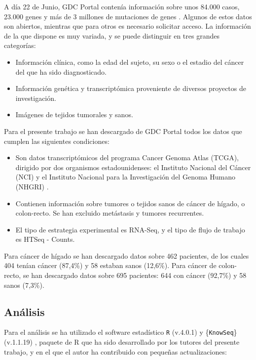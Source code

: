 A día 22 de Junio, GDC Portal contenía información sobre unos 84.000 casos, 23.000 genes y más de 3 millones de mutaciones de genes \cite{GDCPortal}. Algunos de estos datos son abiertos, mientras que para otros es necesario solicitar acceso. La información de la que dispone es muy variada, y se puede distinguir en tres grandes categorías:

\begin{itemize}
	\item Información clínica, como la edad del sujeto, su sexo o el estadio del cáncer del que ha sido diagnosticado.
	\item Información genética y transcriptómica proveniente de diversos proyectos de investigación.
	\item Imágenes de tejidos tumorales y sanos.
\end{itemize} 

Para el presente trabajo se han descargado de GDC Portal todos los datos que cumplen las siguientes condiciones:

\begin{itemize}
	\item Son datos transcriptómicos del programa Cancer Genoma Atlas (TCGA), dirigido por dos organismos estadounidenses: el Instituto Nacional del Cáncer (NCI) y el Instituto Nacional para la Investigación del Genoma Humano (NHGRI) \cite{NationalCancerInstitutea}. 
	\item Contienen información sobre tumores o tejidos sanos de cáncer de hígado, o colon-recto. Se han excluido metástasis y tumores recurrentes.
	\item El tipo de estrategia experimental es RNA-Seq, y el tipo de flujo de trabajo es HTSeq - Counts.
\end{itemize}

Para cáncer de hígado se han descargado datos sobre 462 pacientes, de los cuales 404 tenían cáncer (87,4\%) y 58 estaban sanos (12,6\%).  Para cáncer de colon-recto, se han descargado datos sobre 695 pacientes: 644 con cáncer (92,7\%) y 58 sanos (7,3\%).

\subsection{Análisis}

Para el análisis se ha utilizado el software estadístico \texttt{R} (v.4.0.1) \cite{R} y \{\texttt{KnowSeq}\} (v.1.1.19) \cite{KnowSeq}, paquete de R que ha sido desarrollado por los tutores del presente trabajo, y en el que el autor ha contribuido con pequeñas actualizaciones:

